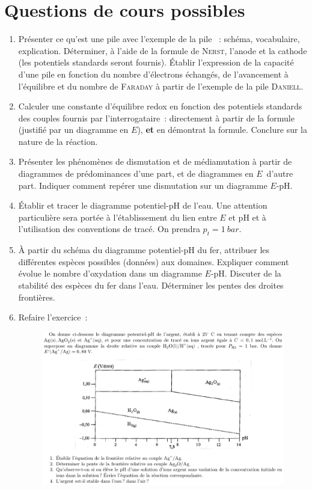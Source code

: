 \documentclass[a4paper, 10pt, final, garamond]{book}
\begin{document}
\section{Questions de cours possibles}
\begin{enumerate}[label=\sqenumi]
    \item Présenter ce qu'est une pile avec l'exemple de la pile
      ~: schéma, vocabulaire, explication. Déterminer, à l'aide
      de la formule de \textsc{Nerst}, l'anode et la cathode (les potentiels
      standards seront fournis). Établir l'expression de la capacité d'une pile
      en fonction du nombre d'électrons échangés, de l'avancement à l'équilibre
      et du nombre de \textsc{Faraday} à partir de l'exemple de la pile
      \textsc{Daniell}.

    \item Calculer une constante d'équilibre redox en fonction des potentiels
      standards des couples fournis par l'interrogataire~: directement à partir
      de la formule (justifié par un diagramme en $E$\textdegree), \textbf{et}
      en démontrat la formule. Conclure sur la nature de la réaction.

    \item Présenter les phénomènes de dismutation et de médiamutation à partir
      de diagrammes de prédominances d'une part, et de diagrammes en
      $E$\textdegree\ d'autre part. Indiquer comment repérer une dismutation sur
      un diagramme $E$-pH.

    \item Établir et tracer le diagramme potentiel-pH de l'eau. Une attention
      particulière sera portée à l'établissement du lien entre $E$ et pH et à
      l'utilisation des conventions de tracé. On prendra $p_t = \SI{1}{bar}$.

    \item À partir du schéma du diagramme potentiel-pH du fer, attribuer les
      différentes espèces possibles (données) aux domaines. Expliquer comment
      évolue le nombre d'oxydation dans un diagramme $E$-pH. Discuter de la
      stabilité des espèces du fer dans l'eau. Déterminer les pentes des
      droites frontières.

    \item Refaire l'exercice~:
      \begin{figure}[h!]
        \begin{center}
          \includegraphics[width=.8\linewidth]{../figures/ch25/ch25_exo1}
        \end{center}
      \end{figure}


\end{enumerate}
\end{document}
